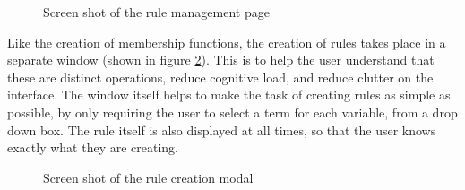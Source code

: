 \begin{figure}[ht!]
	\vspace{-2mm}
	\begin{center}
	\end{center}
	\vspace{-6mm}
	\caption{Screen shot of the rule management page}
	\label{fig:ss-ui-5}
	\vspace{-2mm}
\end{figure}

\noindent
Like the creation of membership functions, the creation of rules takes place in a separate window (shown in figure \ref{fig:ss-ui-6}). This is to help the user understand that these are distinct operations, reduce cognitive load, and reduce clutter on the interface. The window itself helps to make the task of creating rules as simple as possible, by only requiring the user to select a term for each variable, from a drop down box. The rule itself is also displayed at all times, so that the user knows exactly what they are creating.

\begin{figure}[ht!]
	\begin{center}
	\end{center}
	\vspace{-6mm}
	\caption{Screen shot of the rule creation modal}
	\label{fig:ss-ui-6}
	\vspace{-7mm}
\end{figure}


